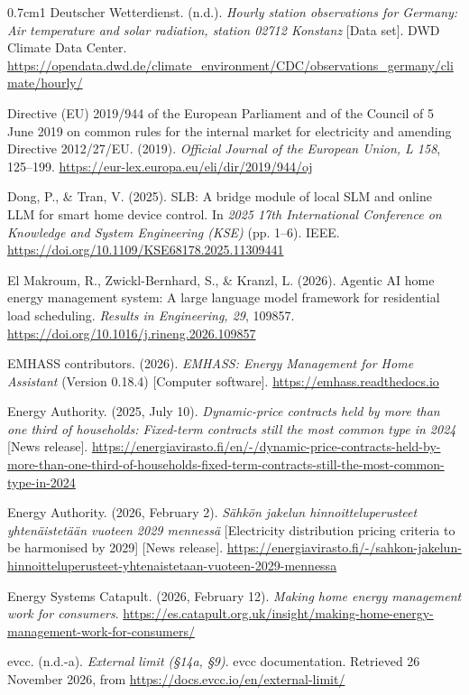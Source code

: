 \begin{hangparas}{0.7cm}{1}
Deutscher Wetterdienst. (n.d.). \textit{Hourly station observations
for Germany: Air temperature and solar radiation, station 02712
Konstanz} [Data set]. DWD Climate Data Center.
\url{https://opendata.dwd.de/climate_environment/CDC/observations_germany/climate/hourly/}

Directive (EU) 2019/944 of the European Parliament and of the Council
of 5 June 2019 on common rules for the internal market for electricity
and amending Directive 2012/27/EU. (2019). \textit{Official Journal of
the European Union, L 158}, 125--199.
\url{https://eur-lex.europa.eu/eli/dir/2019/944/oj}

Dong, P., \& Tran, V. (2025). SLB: A bridge module of local SLM and
online LLM for smart home device control. In \textit{2025 17th
International Conference on Knowledge and System Engineering (KSE)}
(pp. 1--6). IEEE. \url{https://doi.org/10.1109/KSE68178.2025.11309441}

El Makroum, R., Zwickl-Bernhard, S., \& Kranzl, L. (2026). Agentic AI
home energy management system: A large language model framework for
residential load scheduling. \textit{Results in Engineering, 29},
109857. \url{https://doi.org/10.1016/j.rineng.2026.109857}

EMHASS contributors. (2026). \textit{EMHASS: Energy Management for Home
Assistant} (Version 0.18.4) [Computer software].
\url{https://emhass.readthedocs.io}

Energy Authority. (2025, July 10). \textit{Dynamic-price contracts held
by more than one third of households: Fixed-term contracts still the
most common type in 2024} [News release].
\url{https://energiavirasto.fi/en/-/dynamic-price-contracts-held-by-more-than-one-third-of-households-fixed-term-contracts-still-the-most-common-type-in-2024}

Energy Authority. (2026, February 2). \textit{Sähkön jakelun
hinnoitteluperusteet yhtenäistetään vuoteen 2029 mennessä} [Electricity
distribution pricing criteria to be harmonised by 2029] [News release].
\url{https://energiavirasto.fi/-/sahkon-jakelun-hinnoitteluperusteet-yhtenaistetaan-vuoteen-2029-mennessa}

Energy Systems Catapult. (2026, February 12). \textit{Making home
energy management work for consumers}.
\url{https://es.catapult.org.uk/insight/making-home-energy-management-work-for-consumers/}

evcc. (n.d.-a). \textit{External limit (§14a, §9)}. evcc documentation.
Retrieved 26 November 2026, from
\url{https://docs.evcc.io/en/external-limit/}


\end{hangparas}
